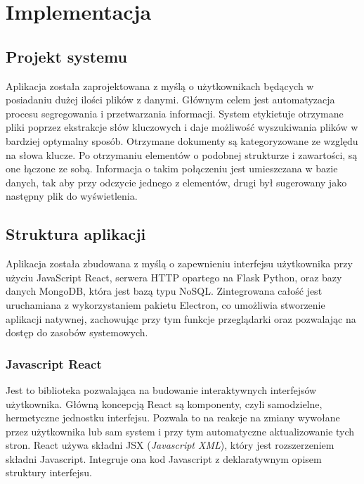 \documentclass[12pt,a4paper,twoside]{article}
\begin{document}
\section{Implementacja}
\subsection{Projekt systemu}
Aplikacja została zaprojektowana z myślą o użytkownikach będących w posiadaniu dużej ilości plików z danymi. Głównym celem jest automatyzacja procesu segregowania i przetwarzania informacji. System etykietuje otrzymane pliki poprzez ekstrakcje słów kluczowych i daje możliwość wyszukiwania plików w bardziej optymalny sposób. Otrzymane dokumenty są kategoryzowane ze względu na słowa klucze. Po otrzymaniu elementów o podobnej strukturze i zawartości, są one łączone ze sobą. Informacja o takim połączeniu jest umieszczana w bazie danych, tak aby przy odczycie jednego z elementów, drugi był sugerowany jako następny plik do wyświetlenia. \par
\subsection{Struktura aplikacji}
Aplikacja została zbudowana z myślą o zapewnieniu interfejsu użytkownika przy użyciu JavaScript React, serwera HTTP opartego na Flask Python, oraz bazy danych MongoDB, która jest bazą typu NoSQL. Zintegrowana całość jest uruchamiana z wykorzystaniem pakietu Electron, co umożliwia stworzenie aplikacji natywnej, zachowując przy tym funkcje przeglądarki oraz pozwalając na dostęp do zasobów systemowych.
\subsubsection{Javascript React}
Jest to biblioteka pozwalająca na budowanie interaktywnych interfejsów użytkownika. Główną koncepcją React są komponenty, czyli samodzielne, hermetyczne jednostku interfejsu. Pozwala to na reakcje na zmiany wywołane przez użytkownika lub sam system i przy tym automatyczne aktualizowanie tych stron. React używa składni JSX (\textit{Javascript XML}), który jest rozszerzeniem składni Javascript. Integruje ona kod Javascript z deklaratywnym opisem struktury interfejsu.
\end{document}
